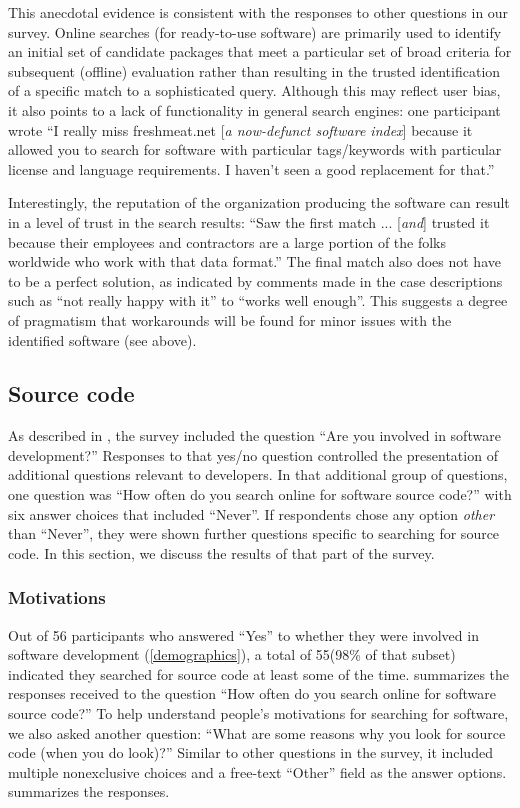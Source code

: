 \documentclass{casicswhitepaper}
\newcommand{\totalDevelopers}{56\xspace}
\newcommand{\totalSearchers}{55\xspace}
\begin{document}
This anecdotal evidence is consistent with the responses to other questions in our survey. Online searches (for ready-to-use software) are primarily used to identify an initial set of candidate packages that meet a particular set of broad criteria for subsequent (offline) evaluation rather than resulting in the trusted identification of a specific match to a sophisticated query. Although this may reflect user bias, it also points to a lack of functionality in general search engines: one participant wrote ``I really miss freshmeat.net [\emph{a now-defunct software index}] because it allowed you to search for software with particular tags/keywords with particular license and language requirements. I haven't seen a good replacement for that.''

Interestingly, the reputation of the organization producing the software can result in a level of trust in the search results: ``Saw the first match ... [\emph{and}] trusted it because their employees and contractors are a large portion of the folks worldwide who work with that data format.'' The final match also does not have to be a perfect solution, as indicated by comments made in the case descriptions such as ``not really happy with it'' to ``works well enough''. This suggests a degree of pragmatism that workarounds will be found for minor issues with the identified software (see above).


\subsection{Source code}

As described in , the survey included the question ``Are you involved in software development?''  Responses to that yes/no question controlled the presentation of additional questions relevant to developers.  In that additional group of questions, one question was ``How often do you search online for software source code?'' with six answer choices that included ``Never''.  If respondents chose any option \emph{other} than ``Never'', they were shown further questions specific to searching for source code.  In this section, we discuss the results of that part of the survey.


\subsubsection{Motivations}
\label{motivations-for-src-search}

Out of \totalDevelopers participants who answered ``Yes'' to whether they were involved in software development (\ref{demographics}), a total of \totalSearchers (98\% of that subset) indicated they searched for source code at least some of the time.   summarizes the responses received to the question ``How often do you search online for software source code?''  To help understand people's motivations for searching for software, we also asked another question: ``What are some reasons why you look for source code (when you do look)?''  Similar to other questions in the survey, it included multiple nonexclusive choices and a free-text ``Other'' field as the answer options.   summarizes the responses.
\end{document}
